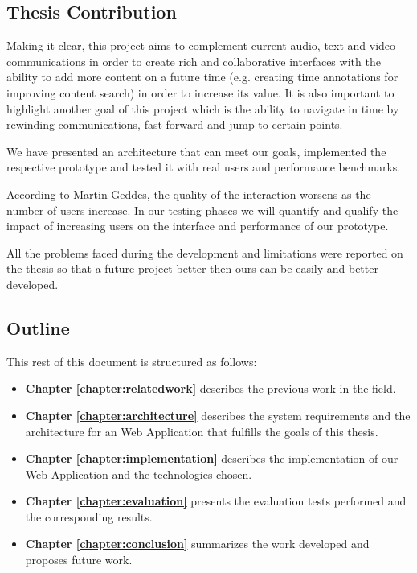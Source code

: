 \documentclass[conference,compsoc,a4paper]{IEEEtran}
\begin{document}
\subsection{Thesis Contribution}
\label{section:contribution}

Making it clear, this project aims to complement current audio, text and video communications in order to create rich and collaborative interfaces with the ability to add more content on a future time (e.g. creating time annotations for improving content search) in order to increase its value. It is also important to highlight another goal of this project which is the ability to navigate in time by rewinding communications, fast-forward and jump to certain points.

	We have presented an architecture that can meet our goals, implemented the respective prototype and tested it with real users and performance benchmarks.

	According to Martin Geddes, the quality of the interaction worsens as the number of users increase\cite{geddes}. In our testing phases we will quantify and qualify the impact of increasing users on the interface and performance of our prototype. 

	All the problems faced during the development and limitations were reported on the thesis so that a future project better then ours can be easily and better developed.

\subsection{Outline}

This rest of this document is structured as follows:

\begin{itemize}

\item \textbf{Chapter \ref{chapter:relatedwork}} describes the previous work in the field.
\item \textbf{Chapter \ref{chapter:architecture}} describes the system requirements and the architecture for an Web Application that fulfills the goals of this thesis.
\item \textbf{Chapter \ref{chapter:implementation}} describes the implementation of our Web Application and the technologies chosen.
\item \textbf{Chapter \ref{chapter:evaluation}} presents the evaluation tests performed and the corresponding results.
\item \textbf{Chapter \ref{chapter:conclusion}} summarizes the work developed and proposes future work.
\end{itemize}
\end{document}

